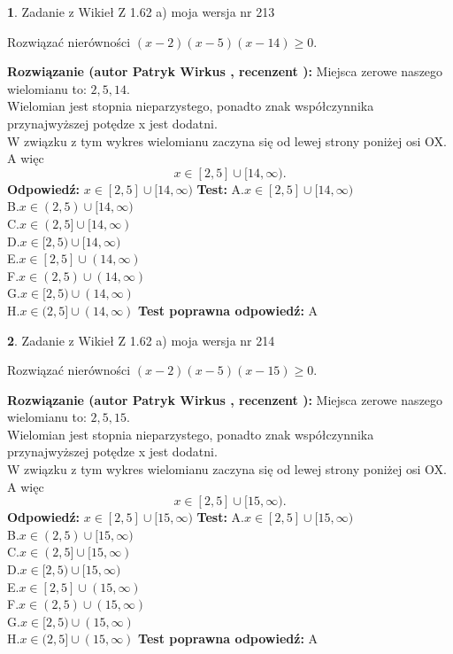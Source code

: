 \documentclass[12pt, a4paper]{article}
\theoremstyle{definition} %
\newtheorem{zad}{}
\newcommand{\zadStart}[1]{\begin{zad}#1\newline}
\newcommand{\zadStop}{\end{zad}}
\newcommand{\rozwStart}[2]{\noindent \textbf{Rozwiązanie (autor #1 , recenzent #2): }\newline}
\newcommand{\rozwStop}{\newline}
\newcommand{\odpStart}{\noindent \textbf{Odpowiedź:}\newline}
\newcommand{\odpStop}{\newline}
\newcommand{\testStart}{\noindent \textbf{Test:}\newline}
\newcommand{\testStop}{\newline}
\newcommand{\kluczStart}{\noindent \textbf{Test poprawna odpowiedź:}\newline}
\newcommand{\kluczStop}{\newline}
\begin{document}
\zadStart{Zadanie z Wikieł Z 1.62 a) moja wersja nr 213}

Rozwiązać nierówności $(x-2)(x-5)(x-14)\ge0$.
\zadStop
\rozwStart{Patryk Wirkus}{}
Miejsca zerowe naszego wielomianu to: $2, 5, 14$.\\
Wielomian jest stopnia nieparzystego, ponadto znak współczynnika przy\linebreak najwyższej potędze x jest dodatni.\\ W związku z tym wykres wielomianu zaczyna się od lewej strony poniżej osi OX. A więc $$x \in [2,5] \cup [14,\infty).$$
\rozwStop
\odpStart
$x \in [2,5] \cup [14,\infty)$
\odpStop
\testStart
A.$x \in [2,5] \cup [14,\infty)$\\
B.$x \in (2,5) \cup [14,\infty)$\\
C.$x \in (2,5] \cup [14,\infty)$\\
D.$x \in [2,5) \cup [14,\infty)$\\
E.$x \in [2,5] \cup (14,\infty)$\\
F.$x \in (2,5) \cup (14,\infty)$\\
G.$x \in [2,5) \cup (14,\infty)$\\
H.$x \in (2,5] \cup (14,\infty)$
\testStop
\kluczStart
A
\kluczStop



\zadStart{Zadanie z Wikieł Z 1.62 a) moja wersja nr 214}

Rozwiązać nierówności $(x-2)(x-5)(x-15)\ge0$.
\zadStop
\rozwStart{Patryk Wirkus}{}
Miejsca zerowe naszego wielomianu to: $2, 5, 15$.\\
Wielomian jest stopnia nieparzystego, ponadto znak współczynnika przy\linebreak najwyższej potędze x jest dodatni.\\ W związku z tym wykres wielomianu zaczyna się od lewej strony poniżej osi OX. A więc $$x \in [2,5] \cup [15,\infty).$$
\rozwStop
\odpStart
$x \in [2,5] \cup [15,\infty)$
\odpStop
\testStart
A.$x \in [2,5] \cup [15,\infty)$\\
B.$x \in (2,5) \cup [15,\infty)$\\
C.$x \in (2,5] \cup [15,\infty)$\\
D.$x \in [2,5) \cup [15,\infty)$\\
E.$x \in [2,5] \cup (15,\infty)$\\
F.$x \in (2,5) \cup (15,\infty)$\\
G.$x \in [2,5) \cup (15,\infty)$\\
H.$x \in (2,5] \cup (15,\infty)$
\testStop
\kluczStart
A
\kluczStop
\end{document}
